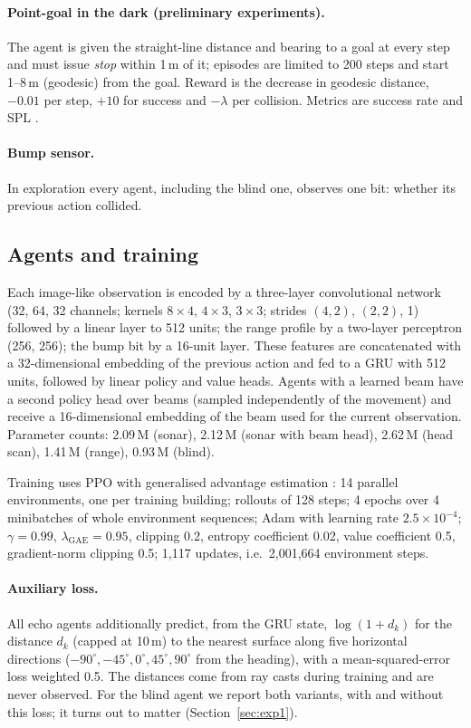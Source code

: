 \documentclass[10pt]{article}
\begin{document}
\paragraph{Point-goal in the dark (preliminary experiments).} The agent is given the straight-line distance and bearing to a goal at every step and must issue \emph{stop} within 1\,m of it; episodes are limited to 200 steps and start 1--8\,m (geodesic) from the goal. Reward is the decrease in geodesic distance, $-0.01$ per step, $+10$ for success and $-\lambda$ per collision. Metrics are success rate and SPL \citep{anderson2018evaluation}.
\paragraph{Bump sensor.} In exploration every agent, including the blind one, observes one bit: whether its previous action collided.

\subsection{Agents and training}
Each image-like observation is encoded by a three-layer convolutional network (32, 64, 32 channels; kernels $8\times4$, $4\times3$, $3\times3$; strides $(4,2)$, $(2,2)$, 1) followed by a linear layer to 512 units; the range profile by a two-layer perceptron (256, 256); the bump bit by a 16-unit layer. These features are concatenated with a 32-dimensional embedding of the previous action and fed to a GRU \citep{cho2014learning} with 512 units, followed by linear policy and value heads. Agents with a learned beam have a second policy head over beams (sampled independently of the movement) and receive a 16-dimensional embedding of the beam used for the current observation. Parameter counts: 2.09\,M (sonar), 2.12\,M (sonar with beam head), 2.62\,M (head scan), 1.41\,M (range), 0.93\,M (blind).

Training uses PPO \citep{schulman2017proximal} with generalised advantage estimation \citep{schulman2016high}: 14 parallel environments, one per training building; rollouts of 128 steps; 4 epochs over 4 minibatches of whole environment sequences; Adam with learning rate $2.5\times10^{-4}$; $\gamma=0.99$, $\lambda_\text{GAE}=0.95$, clipping 0.2, entropy coefficient 0.02, value coefficient 0.5, gradient-norm clipping 0.5; 1{,}117 updates, i.e.\ 2{,}001{,}664 environment steps.

\paragraph{Auxiliary loss.} All echo agents additionally predict, from the GRU state, $\log(1+d_k)$ for the distance $d_k$ (capped at 10\,m) to the nearest surface along five horizontal directions ($-90^\circ,-45^\circ,0^\circ,45^\circ,90^\circ$ from the heading), with a mean-squared-error loss weighted 0.5. The distances come from ray casts during training and are never observed. For the blind agent we report both variants, with and without this loss; it turns out to matter (Section~\ref{sec:exp1}).
\end{document}
